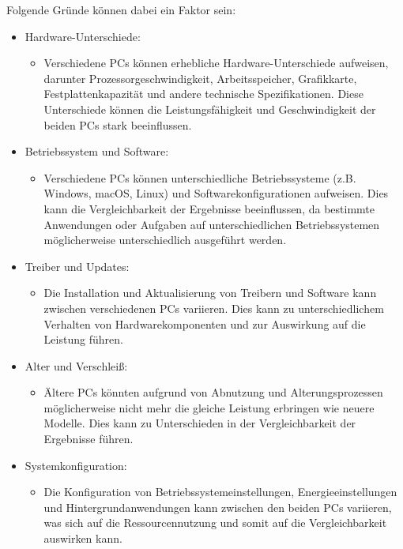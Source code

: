 Folgende Gründe können dabei ein Faktor sein:

\begin{itemize}
    \item Hardware-Unterschiede: 
    \begin{itemize}
        \item Verschiedene PCs können erhebliche Hardware-Unterschiede aufweisen, darunter Prozessorgeschwindigkeit, Arbeitsspeicher, Grafikkarte, Festplattenkapazität und andere technische Spezifikationen. Diese Unterschiede können die Leistungsfähigkeit und Geschwindigkeit der beiden PCs stark beeinflussen.
    \end{itemize}
    \item  Betriebssystem und Software:
    \begin{itemize}
        \item Verschiedene PCs können unterschiedliche Betriebssysteme (z.B. Windows, macOS, Linux) und Softwarekonfigurationen aufweisen. Dies kann die Vergleichbarkeit der Ergebnisse beeinflussen, da bestimmte Anwendungen oder Aufgaben auf unterschiedlichen Betriebssystemen möglicherweise unterschiedlich ausgeführt werden.
    \end{itemize}
    \item Treiber und Updates:
    \begin{itemize}
        \item Die Installation und Aktualisierung von Treibern und Software kann zwischen verschiedenen PCs variieren. Dies kann zu unterschiedlichem Verhalten von Hardwarekomponenten und zur Auswirkung auf die Leistung führen.
    \end{itemize}
    \item Alter und Verschleiß:
    \begin{itemize}
        \item Ältere PCs könnten aufgrund von Abnutzung und Alterungsprozessen möglicherweise nicht mehr die gleiche Leistung erbringen wie neuere Modelle. Dies kann zu Unterschieden in der Vergleichbarkeit der Ergebnisse führen.
    \end{itemize}
    \item Systemkonfiguration: 
    \begin{itemize}
        \item Die Konfiguration von Betriebssystemeinstellungen, Energieeinstellungen und Hintergrundanwendungen kann zwischen den beiden PCs variieren, was sich auf die Ressourcennutzung und somit auf die Vergleichbarkeit auswirken kann.
    \end{itemize}
\end{itemize}

